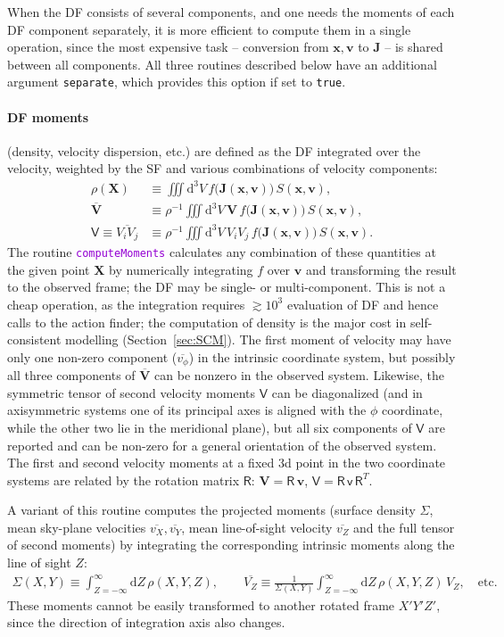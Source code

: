 \documentclass[12pt]{article}
\newcommand{\ttt}[1]{\textcolor{darkviolet}{\texttt{#1}}}
\newcommand{\ppp}[1]{\textcolor{darkolive} {\texttt{#1}}}
\renewcommand{\d}{\mathrm{d}}
\newcommand{\bv}{\boldsymbol{v}}
\newcommand{\bx}{\boldsymbol{x}}
\newcommand{\bX}{\boldsymbol{X}}
\newcommand{\bV}{\boldsymbol{V}}
\newcommand{\bJ}{\boldsymbol{J}}
\let\oldparagraph\paragraph
\renewcommand{\paragraph}[1]{\vspace{-2mm}\oldparagraph{#1}}
\begin{document}
When the DF consists of several components, and one needs the moments of each DF component separately, it is more efficient to compute them in a single operation, since the most expensive task -- conversion from $\bx,\bv$ to $\bJ$ -- is shared between all components. All three routines described below have an additional argument \ppp{separate}, which provides this option if set to \texttt{true}.

\paragraph{DF moments} (density, velocity dispersion, etc.) are defined as the DF integrated over the velocity, weighted by the SF and various combinations of velocity components:
\begin{align*}
\rho(\bX) &\equiv \iiint \d ^3V\, f\big(\bJ(\bx,\bv)\big)\,S(\bx,\bv), \\
\overline{\bV} &\equiv \rho^{-1} \iiint \d ^3V \,\bV\, f\big(\bJ(\bx,\bv)\big)\,S(\bx,\bv), \\
\mathsf{V} \equiv \overline{V_i V_j} &\equiv \rho^{-1} \iiint \d ^3V \,V_i V_j\, f\big(\bJ(\bx,\bv)\big)\,S(\bx,\bv).
\end{align*}
The routine \ttt{computeMoments} calculates any combination of these quantities at the given point $\bX$ by numerically integrating $f$ over $\bv$ and transforming the result to the observed frame; the DF may be single- or multi-component. 
This is not a cheap operation, as the integration requires $\gtrsim 10^3$ evaluation of DF and hence calls to the action finder; the computation of density is the major cost in self-consistent modelling (Section~\ref{sec:SCM}). The first moment of velocity may have only one non-zero component ($\overline{v_\phi}$) in the intrinsic coordinate system, but possibly all three components of $\overline{\bV}$ can be nonzero in the observed system. Likewise, the symmetric tensor of second velocity moments $\mathsf{V}$ can be diagonalized (and in axisymmetric systems one of its principal axes is aligned with the $\phi$ coordinate, while the other two lie in the meridional plane), but all six components of $\mathsf{V}$ are reported and can be non-zero for a general orientation of the observed system. The first and second velocity moments at a fixed 3d point in the two coordinate systems are related by the rotation matrix $\mathsf{R}$: $\bV = \mathsf{R}\,\bv$, $\mathsf{V} = \mathsf{R}\,\mathsf{v}\,\mathsf{R}^T$.

A variant of this routine computes the projected moments (surface density $\Sigma$, mean sky-plane velocities $\overline{v_X}, \overline{v_Y}$, mean line-of-sight velocity $\overline{v_Z}$ and the full tensor of second moments) by integrating the corresponding intrinsic moments along the line of sight $Z$:
\begin{align*}
\Sigma(X,Y) \equiv \int_{Z=-\infty}^\infty \d Z\, \rho(X,Y,Z), \qquad
\overline{V_Z} \equiv \frac{1}{\Sigma(X,Y)} \int_{Z=-\infty}^\infty \d Z\, \rho(X,Y,Z)\, V_Z, \quad\mbox{etc.}
\end{align*}
These moments cannot be easily transformed to another rotated frame $X'Y'Z'$, since the direction of integration axis also changes.
\end{document}
